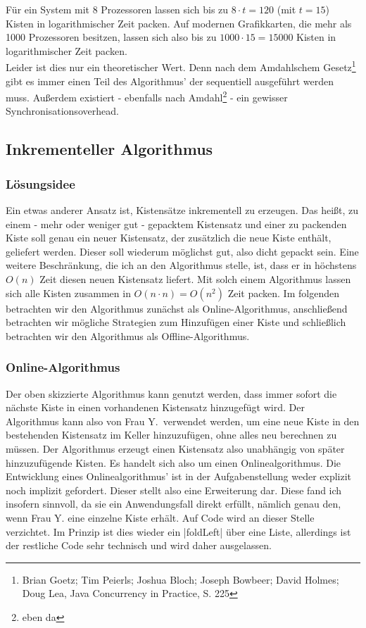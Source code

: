  Für ein System mit 8 Prozessoren lassen sich bis zu $8 \cdot t = 120$ (mit $t=15$) Kisten in logarithmischer Zeit packen.
 Auf modernen Grafikkarten, die mehr als 1000 Prozessoren besitzen, lassen sich also bis zu $1000 \cdot 15=15000$ Kisten in logarithmischer Zeit packen.\\
 Leider ist dies nur ein theoretischer Wert. Denn nach dem Amdahlschem Gesetz\footnote{Brian Goetz; Tim Peierls; Joshua Bloch; Joseph Bowbeer; David Holmes; Doug Lea, Java Concurrency in Practice, S. 225}
  gibt es immer einen Teil des Algorithmus' der sequentiell ausgeführt werden muss.
 Außerdem existiert - ebenfalls nach Amdahl\footnote{eben da} - ein gewisser Synchronisationsoverhead.
\subsection{Inkrementeller Algorithmus}
\label{ink}
\subsubsection{Lösungsidee}
 Ein etwas anderer Ansatz ist, Kistensätze inkrementell zu erzeugen.
 Das heißt, zu einem - mehr oder weniger gut - gepacktem Kistensatz und einer zu packenden Kiste soll genau ein neuer Kistensatz,
  der zusätzlich die neue Kiste enthält, geliefert werden.
 Dieser soll wiederum möglichst gut, also dicht gepackt sein.
 Eine weitere Beschränkung, die ich an den Algorithmus stelle, ist, dass er in höchstens $O(n)$ Zeit diesen neuen Kistensatz liefert.
 Mit solch einem Algorithmus lassen sich alle Kisten zusammen in $O(n \cdot n)=O(n^2)$ Zeit packen.
 Im folgenden betrachten wir den Algorithmus zunächst als Online-Algorithmus, anschließend betrachten wir mögliche Strategien zum Hinzufügen einer Kiste
  und schließlich betrachten wir den Algorithmus als Offline-Algorithmus.
\subsubsection{Online-Algorithmus}
 Der oben skizzierte Algorithmus kann genutzt werden, dass immer sofort die nächste Kiste in einen vorhandenen Kistensatz hinzugefügt wird.
 Der Algorithmus kann also von Frau Y.\ verwendet werden,
  um eine neue Kiste in den bestehenden Kistensatz im Keller hinzuzufügen, ohne alles neu berechnen zu müssen.
 Der Algorithmus erzeugt einen Kistensatz also unabhängig von später hinzuzufügende Kisten.
 Es handelt sich also um einen Onlinealgorithmus. Die Entwicklung eines Onlinealgorithmus' ist in der Aufgabenstellung weder explizit noch implizit gefordert.
 Dieser stellt also eine Erweiterung dar.
 Diese fand ich insofern sinnvoll, da sie ein Anwendungsfall direkt erfüllt, nämlich genau den, wenn Frau Y. eine einzelne Kiste erhält.
 Auf Code wird an dieser Stelle verzichtet. Im Prinzip ist dies wieder ein |foldLeft| über eine Liste, allerdings ist der restliche Code sehr technisch
  und wird daher ausgelassen.
\lstset{basicstyle=\ttfamily}
